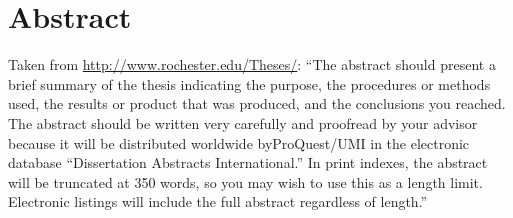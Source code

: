 \documentclass[\main/master.tex]{subfiles}
\begin{document}
\chapter*{Abstract}
\hspace{5 mm} Taken from \url{http://www.rochester.edu/Theses/}: ``The abstract should present a brief summary of the thesis indicating the purpose, the procedures or methods used, the results or product that was produced, and the conclusions you reached. The abstract should be written very carefully and proofread by your advisor because it will be distributed worldwide byProQuest\textsuperscript{\tiny\textregistered}/UMI in the electronic database “Dissertation Abstracts International.” In print indexes, the abstract will be truncated at 350 words, so you may wish to use this as a length limit. Electronic listings will include the full abstract regardless of length.''
\end{document}

